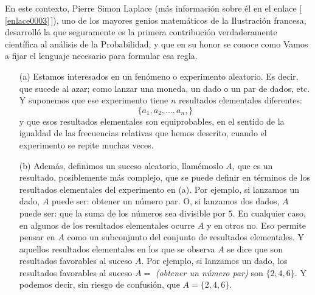 En este contexto, Pierre Simon Laplace (más información sobre él en el enlace
[\,\ref{enlace0003}\label{enlace0003a}\,]),
uno de los mayores genios matemáticos de la Ilustración francesa, desarrolló la que seguramente es
la primera contribución verdaderamente científica al análisis de la Probabilidad, y que en su honor
se conoce como  Vamos a fijar el lenguaje necesario
para formular esa regla.
    \begin{itemize}
        \item[(a)]  Estamos interesados en un {\sf fenómeno o experimento aleatorio}. Es decir, que sucede al azar; como lanzar una moneda, un dado o un par de dados, etc. Y suponemos que ese experimento tiene $n$ {\sf resultados elementales} diferentes:
            \[\{a_1,a_2,\ldots,a_n,\}\]
            y que esos resultados elementales son {\sf equiprobables}, en el sentido de la igualdad de las frecuencias relativas que hemos descrito, cuando el experimento se repite muchas veces.

        \item[(b)]  Además, definimos un {\sf suceso aleatorio}, llamémoslo $A$, que es un resultado, posiblemente más complejo, que se puede definir en términos de los resultados elementales del experimento en (a). Por ejemplo, si lanzamos un dado, $A$ puede ser: obtener un número par. O, si lanzamos dos dados, $A$ puede ser: que la suma de los números sea divisible por $5$. En cualquier caso, en algunos de los resultados elementales ocurre $A$ y en otros no. Eso permite pensar en $A$ como un {\sf subconjunto del conjunto de resultados elementales}. Y aquellos resultados elementales en los que se observa $A$ se dice que son {\sf resultados favorables} al suceso $A$. Por ejemplo, si lanzamos un dado, los resultados favorables al suceso $A=$ {\em(obtener un número par)} son $\{2,4,6\}$. Y podemos decir, sin riesgo de confusión, que $A=\{2,4,6\}$.
    \end{itemize}

